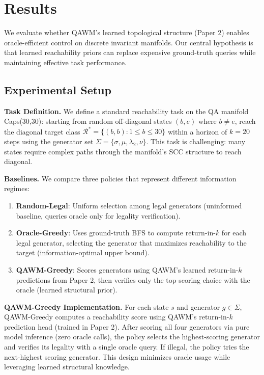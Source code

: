
\section{Results}

We evaluate whether QAWM's learned topological structure (Paper 2) enables oracle-efficient control on discrete invariant manifolds. Our central hypothesis is that learned reachability priors can replace expensive ground-truth queries while maintaining effective task performance.

\subsection{Experimental Setup}

\textbf{Task Definition.} We define a standard reachability task on the QA manifold Caps(30,30): starting from random off-diagonal states $(b,e)$ where $b \neq e$, reach the diagonal target class $\mathcal{R}^* = \{(b,b) : 1 \le b \le 30\}$ within a horizon of $k=20$ steps using the generator set $\Sigma = \{\sigma, \mu, \lambda_2, \nu\}$. This task is challenging: many states require complex paths through the manifold's SCC structure to reach diagonal.

\textbf{Baselines.} We compare three policies that represent different information regimes:

\begin{enumerate}
\item \textbf{Random-Legal}: Uniform selection among legal generators (uninformed baseline, queries oracle only for legality verification).
\item \textbf{Oracle-Greedy}: Uses ground-truth BFS to compute return-in-$k$ for each legal generator, selecting the generator that maximizes reachability to the target (information-optimal upper bound).
\item \textbf{QAWM-Greedy}: Scores generators using QAWM's learned return-in-$k$ predictions from Paper 2, then verifies only the top-scoring choice with the oracle (learned structural prior).
\end{enumerate}

\textbf{QAWM-Greedy Implementation.} For each state $s$ and generator $g \in \Sigma$, QAWM-Greedy computes a reachability score using QAWM's return-in-$k$ prediction head (trained in Paper 2). After scoring all four generators via pure model inference (zero oracle calls), the policy selects the highest-scoring generator and verifies its legality with a single oracle query. If illegal, the policy tries the next-highest scoring generator. This design minimizes oracle usage while leveraging learned structural knowledge.

